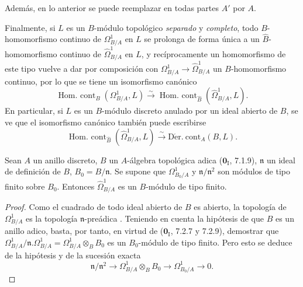 \begin{env}[20.7.14]
Además, en lo anterior se puede reemplazar en todas partes $A'$ por $A$.

Finalmente, si $L$ es un $B$-módulo topológico \emph{separado} y \emph{completo}, todo
$B$-homomorfismo continuo de $\Omega^1_{B/A}$ en $L$ se prolonga de forma
única a un $\widehat B$-homomorfismo continuo de
$\widehat{\Omega}^1_{B/A}$ en $L$, y recíprocamente un homomorfismo de este
tipo vuelve a dar por composición con $\Omega^1_{B/A}\to\widehat{\Omega}^1_{B/A}$
un $B$-homomorfismo continuo, por lo que se tiene un isomorfismo canónico
\[
  \operatorname{Hom.\ cont}_B(\Omega^1_{B/A},L)\xrightarrow{\sim}
  \operatorname{Hom.\ cont}_{\widehat B}(\widehat{\Omega}^1_{B/A},L).
\]
En particular, si $L$ es un $B$-módulo discreto anulado por un ideal
abierto de $B$, se ve que el isomorfismo canónico
 también puede escribirse
\begin{equation}
\tag{20.7.14.4}
\label{0.20.7.14.4-fr}
  \operatorname{Hom.\ cont}_{\widehat B}(\widehat{\Omega}^1_{B/A},L)
  \xrightarrow{\sim}\operatorname{D\acute{e}r.\ cont}_A(B,L).
\end{equation}
\end{env}

\begin{proposition}[20.7.15]
\label{0.20.7.15-fr}
Sean $A$ un anillo discreto, $B$ un $A$-álgebra topológica adica
\textup{($\mathbf{0}_{\mathrm I}$, 7.1.9)}, $\mathfrak{n}$ un ideal de definición de
$B$, $B_0=B/\mathfrak{n}$. Se supone que $\Omega^1_{B_0/A}$ y
$\mathfrak{n}/\mathfrak{n}^2$ son módulos de tipo finito sobre $B_0$. Entonces
$\widehat{\Omega}^1_{B/A}$ es un $B$-módulo de tipo finito.
\end{proposition}

\begin{proof}
Como el cuadrado de todo ideal abierto de $B$ es abierto, la topología de
$\Omega^1_{B/A}$ es la topología $\mathfrak{n}$-preádica
. Teniendo en cuenta la hipótesis de que $B$ es un anillo adico,
basta, por tanto, en virtud de ($\mathbf{0}_{\mathrm I}$, 7.2.7 y 7.2.9), demostrar
que $\Omega^1_{B/A}/\mathfrak{n}.\Omega^1_{B/A}=
\Omega^1_{B/A}\otimes_B B_0$ es un $B_0$-módulo de tipo finito. Pero esto
se deduce de la hipótesis y de la sucesión exacta 
\[
  \mathfrak{n}/\mathfrak{n}^2\to
  \Omega^1_{B/A}\otimes_B B_0\to\Omega^1_{B_0/A}\to0.
\]
\end{proof}

